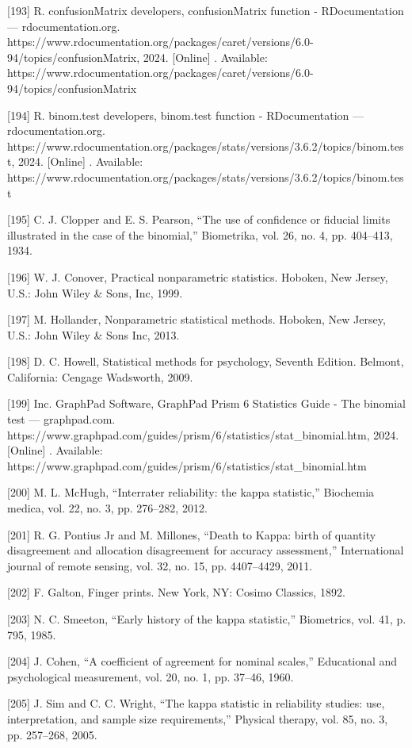 \documentclass[sn-mathphys-num]{sn-jnl}%
\begin{document}
[193] R. confusionMatrix developers, confusionMatrix function - RDocumentation — rdocumentation.org. https://www.rdocumentation.org/packages/caret/versions/6.0-94/topics/confusionMatrix, 2024. [Online] . Available: https://www.rdocumentation.org/packages/caret/versions/6.0-94/topics/confusionMatrix

[194] R. binom.test developers, binom.test function - RDocumentation — rdocumentation.org. https://www.rdocumentation.org/packages/stats/versions/3.6.2/topics/binom.test, 2024. [Online] . Available: https://www.rdocumentation.org/packages/stats/versions/3.6.2/topics/binom.test

[195] C. J. Clopper and E. S. Pearson, “The use of confidence or fiducial limits illustrated in the case of the binomial,” Biometrika, vol. 26, no. 4, pp. 404–413, 1934.

[196] W. J. Conover, Practical nonparametric statistics. Hoboken, New Jersey, U.S.: John Wiley & Sons, Inc, 1999.

[197] M. Hollander, Nonparametric statistical methods. Hoboken, New Jersey, U.S.: John Wiley & Sons Inc, 2013.

[198] D. C. Howell, Statistical methods for psychology, Seventh Edition. Belmont, California: Cengage Wadsworth, 2009.

[199] Inc. GraphPad Software, GraphPad Prism 6 Statistics Guide - The binomial test — graphpad.com. https://www.graphpad.com/guides/prism/6/statistics/stat_binomial.htm, 2024. [Online] . Available: https://www.graphpad.com/guides/prism/6/statistics/stat_binomial.htm

[200] M. L. McHugh, “Interrater reliability: the kappa statistic,” Biochemia medica, vol. 22, no. 3, pp. 276–282, 2012.

[201] R. G. Pontius Jr and M. Millones, “Death to Kappa: birth of quantity disagreement and allocation disagreement for accuracy assessment,” International journal of remote sensing, vol. 32, no. 15, pp. 4407–4429, 2011.

[202] F. Galton, Finger prints. New York, NY: Cosimo Classics, 1892.

[203] N. C. Smeeton, “Early history of the kappa statistic,” Biometrics, vol. 41, p. 795, 1985.

[204] J. Cohen, “A coefficient of agreement for nominal scales,” Educational and psychological measurement, vol. 20, no. 1, pp. 37–46, 1960.

[205] J. Sim and C. C. Wright, “The kappa statistic in reliability studies: use, interpretation, and sample size requirements,” Physical therapy, vol. 85, no. 3, pp. 257–268, 2005.
\end{document}
